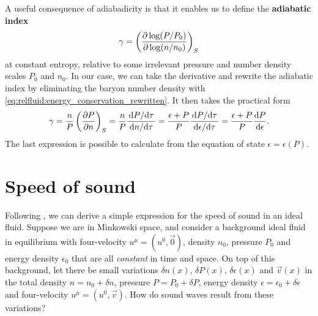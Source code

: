 A useful consequence of adiabadicity is that it enables us to define the \textbf{adiabatic index}
\begin{equation}
	\gamma = \left( \pdv{\log (P/P_0)}{\log (n/n_0)} \right)_S
\end{equation}
at constant entropy, relative to some irrelevant pressure and number density scales $P_0$ and $n_0$.
In our case, we can take the derivative and rewrite the adiabatic index by eliminating the baryon number density with \cref{eq:relfluid:energy_conservation_rewritten}.
It then takes the practical form
\begin{equation}
	\gamma = \frac{n}{P} \left( \pdv{P}{n} \right)_S
	       = \frac{n}{P} \frac{\odv{P}/{\tau}}{\odv{n}/{\tau}}
	       = \frac{\epsilon+P}{P} \frac{\odv{P}/{\tau}}{\odv{\epsilon}/{\tau}}
	       = \frac{\epsilon+P}{P} \odv{P}{\epsilon} .
\label{eq:relfluid:adiabadicity}
\end{equation}
The last expression is possible to calculate from the equation of state $\epsilon = \epsilon(P)$.

\section{Speed of sound}

Following \cite{ref:weinberg_gravity}, we can derive a simple expression for the speed of sound in an ideal fluid.
Suppose we are in Minkowski space, and consider a background ideal fluid in equilibrium with four-velocity $u^\mu = (u^0, \vec{0})$, density $n_0$, pressure $P_0$ and energy density $\epsilon_0$ that are all \emph{constant} in time and space.
On top of this background, let there be small variations $\delta n(x)$, $\delta P(x)$, $\delta \epsilon(x)$ and $\vec{v}(x)$ in the total density $n = n_0 + \delta n$, pressure $P = P_0 + \delta P$, energy density $\epsilon = \epsilon_0 + \delta \epsilon$ and four-velocity $u^\mu = (u^0, \vec{v})$.
How do sound waves result from these variations?

